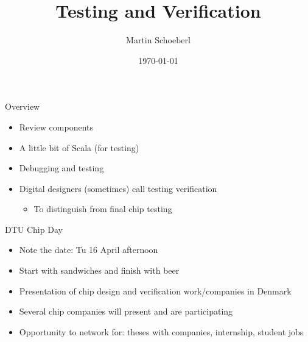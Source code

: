 

\newif\ifbook


\title{Testing and Verification}
\author{Martin Schoeberl}
\date{\today}



\begin{frame}
\titlepage
\end{frame}


\begin{frame}[fragile]{Overview}
\begin{itemize}
\item Review components
\item A little bit of Scala (for testing)
\item Debugging and testing
\item Digital designers (sometimes) call testing verification
\begin{itemize}
\item To distinguish from final chip testing
\end{itemize}
\end{itemize}
\end{frame}

\begin{frame}[fragile]{DTU Chip Day}
\begin{itemize}
\item Note the date: Tu 16 April afternoon
\item Start with sandwiches and finish with beer
\item Presentation of chip design and verification work/companies in Denmark
\item Several chip companies will present and are participating
\item Opportunity to network for: theses with companies, internship, student jobs
\end{itemize}
\end{frame}

